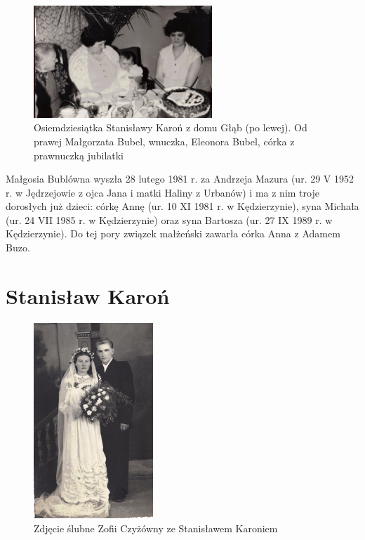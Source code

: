 \begin{figure}
\begin{center}
\includegraphics[width=0.6\textwidth]{zdjecia/stanislawa_karon_eleonora_i_malgorzata_bublowie.jpg}
\caption[,,Osiemdziesiątka'' Stanisławy Karoń - cztery pokolenia]{Osiemdziesiątka Stanisławy Karoń z domu Głąb (po lewej). Od prawej Małgorzata Bubel, wnuczka, Eleonora Bubel, córka z prawnuczką jubilatki}
\label{rys:stanislawa_karon_eleonora_i_malgorzata_bublowie}
\end{center}
\end{figure}

Małgosia Bublówna wyszła 28 lutego 1981 r. za Andrzeja Mazura (ur. 29 V 1952 r. w Jędrzejowie z ojca Jana i matki Haliny z Urbanów) i ma z nim troje dorosłych już dzieci: córkę Annę (ur. 10 XI 1981 r. w Kędzierzynie), syna Michała (ur. 24 VII 1985 r. w Kędzierzynie) oraz syna Bartosza (ur. 27 IX 1989 r. w Kędzierzynie). Do tej pory związek małżeński zawarła córka Anna z Adamem Buzo.

\section{Stanisław Karoń}

\begin{figure}
\begin{center}
\includegraphics[width=0.4\textwidth]{zdjecia/slub_stanislawa_i_zofii_karon.jpg}
\caption{Zdjęcie ślubne Zofii Czyżówny ze Stanisławem Karoniem}
\label{rys:slub_stanislawa_i_zofii_karon}
\end{center}
\end{figure}

